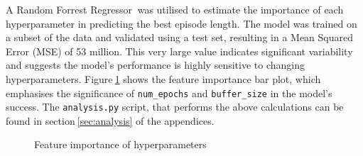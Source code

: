 A Random Forrest Regressor$~$\cite{randomforrestM} was utilised to estimate the importance of each hyperparameter in predicting the best episode length. The model was trained on a subset of the data and validated using a test set, resulting in a Mean Squared Error (MSE) of 53 million. This very large value indicates significant variability and suggests the model's performance is highly sensitive to changing hyperparameters. Figure$~$\ref{feature_importance} shows the feature importance bar plot, which emphasises the significance of \texttt{num\_epochs} and \texttt{buffer\_size} in the model's success. The \texttt{analysis.py} script, that performs the above calculations can be found in section$~$\ref{sec:analysis} of the appendices.


\begin{figure}[!htb]
    \centering
    \caption{Feature importance of hyperparameters}\label{feature_importance}
\end{figure}


